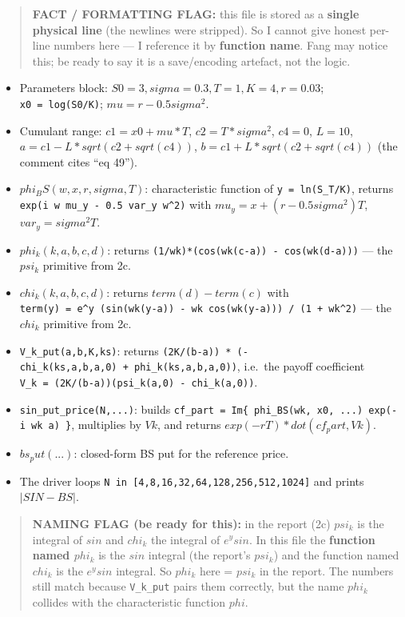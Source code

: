 \documentclass[
  11pt,
]{article}
\providecommand{\tightlist}{%
  \setlength{\itemsep}{0pt}\setlength{\parskip}{0pt}}
\begin{document}
\begin{quote}
\textbf{FACT / FORMATTING FLAG:} this file is stored as a \textbf{single
physical line} (the newlines were stripped). So I cannot give honest
per-line numbers here --- I reference it by \textbf{function name}. Fang
may notice this; be ready to say it is a save/encoding artefact, not the
logic.
\end{quote}

\begin{itemize}
\tightlist
\item
  Parameters block: \(S0=3, sigma=0.3, T=1, K=4, r=0.03\);
  \texttt{x0\ =\ log(S0/K)}; \(mu = r - 0.5 sigma^2\).
\item
  Cumulant range: \(c1 = x0 + mu*T\), \(c2 = T*sigma^2\), \(c4 = 0\),
  \(L = 10\), \(a = c1 - L*sqrt(c2 + sqrt(c4))\),
  \(b = c1 + L*sqrt(c2 + sqrt(c4))\) (the comment cites ``eq 49'').
\item
  \(phi_BS(w, x, r, sigma, T)\): characteristic function of
  \texttt{y\ =\ ln(S\_T/K)}, returns
  \texttt{exp(i\ w\ mu\_y\ -\ 0.5\ var\_y\ w\^{}2)} with
  \(mu_y = x + (r - 0.5 sigma^2) T\), \(var_y = sigma^2 T\).
\item
  \(phi_k(k,a,b,c,d)\): returns
  \texttt{(1/wk)*(cos(wk(c-a))\ -\ cos(wk(d-a)))} --- the \(psi_k\)
  primitive from 2c.
\item
  \(chi_k(k,a,b,c,d)\): returns \(term(d)-term(c)\) with
  \texttt{term(y)\ =\ e\^{}y\ (sin(wk(y-a))\ -\ wk\ cos(wk(y-a)))\ /\ (1\ +\ wk\^{}2)}
  --- the \(chi_k\) primitive from 2c.
\item
  \texttt{V\_k\_put(a,b,K,ks)}: returns
  \texttt{(2K/(b-a))\ *\ (-chi\_k(ks,a,b,a,0)\ +\ phi\_k(ks,a,b,a,0))},
  i.e.~the payoff coefficient
  \texttt{V\_k\ =\ (2K/(b-a))(psi\_k(a,0)\ -\ chi\_k(a,0))}.
\item
  \texttt{sin\_put\_price(N,...)}: builds
  \texttt{cf\_part\ =\ Im\{\ phi\_BS(wk,\ x0,\ ...)\ exp(-i\ wk\ a)\ \}},
  multiplies by \(Vk\), and returns \(exp(-rT) * dot(cf_part, Vk)\).
\item
  \(bs_put(...)\): closed-form BS put for the reference price.
\item
  The driver loops \texttt{N\ in\ {[}4,8,16,32,64,128,256,512,1024{]}}
  and prints \(|SIN - BS|\).
\end{itemize}

\begin{quote}
\textbf{NAMING FLAG (be ready for this):} in the report (2c) \(psi_k\)
is the integral of \(sin\) and \(chi_k\) the integral of \(e^y sin\). In
this file the \textbf{function named \(phi_k\)} is the \(sin\) integral
(the report's \(psi_k\)) and the function named \(chi_k\) is the
\(e^y sin\) integral. So \(phi_k\) here = \(psi_k\) in the report. The
numbers still match because \texttt{V\_k\_put} pairs them correctly, but
the name \(phi_k\) collides with the characteristic function \(phi\).
\end{quote}
\end{document}
